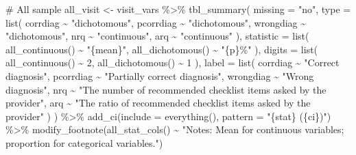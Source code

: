 \documentclass[
  letterpaper,
  DIV=11,
  numbers=noendperiod]{scrartcl}
\newenvironment{Shaded}{\begin{snugshade}}{\end{snugshade}}
\newcommand{\AttributeTok}[1]{\textcolor[rgb]{0.40,0.45,0.13}{#1}}
\newcommand{\CommentTok}[1]{\textcolor[rgb]{0.37,0.37,0.37}{#1}}
\newcommand{\DecValTok}[1]{\textcolor[rgb]{0.68,0.00,0.00}{#1}}
\newcommand{\FunctionTok}[1]{\textcolor[rgb]{0.28,0.35,0.67}{#1}}
\newcommand{\NormalTok}[1]{\textcolor[rgb]{0.00,0.23,0.31}{#1}}
\newcommand{\OtherTok}[1]{\textcolor[rgb]{0.00,0.23,0.31}{#1}}
\newcommand{\SpecialCharTok}[1]{\textcolor[rgb]{0.37,0.37,0.37}{#1}}
\newcommand{\StringTok}[1]{\textcolor[rgb]{0.13,0.47,0.30}{#1}}
\begin{document}
\begin{Shaded}
\begin{Highlighting}[]
\CommentTok{\# All sample}
\NormalTok{all\_visit }\OtherTok{\textless{}{-}}\NormalTok{ visit\_vars }\SpecialCharTok{\%\textgreater{}\%}
                  \FunctionTok{tbl\_summary}\NormalTok{(}
                    \AttributeTok{missing =} \StringTok{"no"}\NormalTok{,}
                    \AttributeTok{type =} \FunctionTok{list}\NormalTok{(}
\NormalTok{                                corrdiag }\SpecialCharTok{\textasciitilde{}} \StringTok{"dichotomous"}\NormalTok{,}
\NormalTok{                                pcorrdiag }\SpecialCharTok{\textasciitilde{}} \StringTok{"dichotomous"}\NormalTok{,}
\NormalTok{                                wrongdiag }\SpecialCharTok{\textasciitilde{}} \StringTok{"dichotomous"}\NormalTok{,}
\NormalTok{                                nrq }\SpecialCharTok{\textasciitilde{}} \StringTok{"continuous"}\NormalTok{,}
\NormalTok{                                arq }\SpecialCharTok{\textasciitilde{}} \StringTok{"continuous"}
\NormalTok{                                ),}
                \AttributeTok{statistic =} \FunctionTok{list}\NormalTok{(}
                                \FunctionTok{all\_continuous}\NormalTok{() }\SpecialCharTok{\textasciitilde{}} \StringTok{"\{mean\}"}\NormalTok{,}
                                \FunctionTok{all\_dichotomous}\NormalTok{() }\SpecialCharTok{\textasciitilde{}} \StringTok{"\{p\}\%"}
\NormalTok{                                ),}
                \AttributeTok{digits =} \FunctionTok{list}\NormalTok{(}
                                \FunctionTok{all\_continuous}\NormalTok{() }\SpecialCharTok{\textasciitilde{}} \DecValTok{2}\NormalTok{,}
                                \FunctionTok{all\_dichotomous}\NormalTok{() }\SpecialCharTok{\textasciitilde{}} \DecValTok{1}
\NormalTok{                              ),}
                \AttributeTok{label =} \FunctionTok{list}\NormalTok{(}
\NormalTok{                                corrdiag }\SpecialCharTok{\textasciitilde{}} \StringTok{"Correct diagnosis"}\NormalTok{,}
\NormalTok{                                pcorrdiag }\SpecialCharTok{\textasciitilde{}} \StringTok{"Partially correct diagnosis"}\NormalTok{,}
\NormalTok{                                wrongdiag }\SpecialCharTok{\textasciitilde{}} \StringTok{"Wrong diagnosis"}\NormalTok{,}
\NormalTok{                                nrq }\SpecialCharTok{\textasciitilde{}} \StringTok{"The number of recommended checklist items asked by the provider"}\NormalTok{,}
\NormalTok{                                arq }\SpecialCharTok{\textasciitilde{}} \StringTok{"The ratio of recommended checklist items asked by the provider"}
\NormalTok{                                )}
\NormalTok{                ) }\SpecialCharTok{\%\textgreater{}\%}
  \FunctionTok{add\_ci}\NormalTok{(}\AttributeTok{include =} \FunctionTok{everything}\NormalTok{(), }\AttributeTok{pattern =} \StringTok{"\{stat\} (\{ci\})"}\NormalTok{) }\SpecialCharTok{\%\textgreater{}\%}
  \FunctionTok{modify\_footnote}\NormalTok{(}\FunctionTok{all\_stat\_cols}\NormalTok{() }\SpecialCharTok{\textasciitilde{}} \StringTok{"Notes: Mean for continuous variables; proportion for categorical variables."}\NormalTok{)}




\end{Highlighting}
\end{Shaded}
\end{document}
